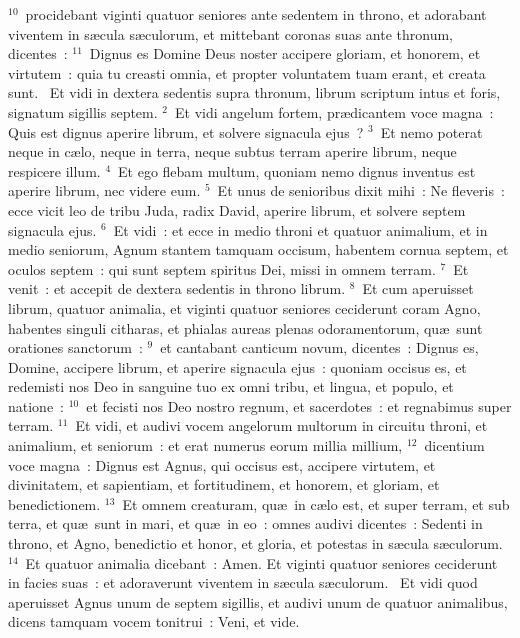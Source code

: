 ${}^{10}$~procidebant viginti quatuor seniores ante sedentem in throno, et adorabant viventem in s\ae cula s\ae culorum, et mittebant coronas suas ante thronum, dicentes~:
${}^{11}$~Dignus es Domine Deus noster accipere gloriam, et honorem, et virtutem~: quia tu creasti omnia, et propter voluntatem tuam erant, et creata sunt.
~\lettrine[lines=10,image=true,loversize=0.05,lraise=-0.03]{E}{}t vidi in dextera sedentis supra thronum, librum scriptum intus et foris, signatum sigillis septem.
${}^{2}$~Et vidi angelum fortem, pr\ae dicantem voce magna~: Quis est dignus aperire librum, et solvere signacula ejus~?
${}^{3}$~Et nemo poterat neque in c\ae lo, neque in terra, neque subtus terram aperire librum, neque respicere illum.
${}^{4}$~Et ego flebam multum, quoniam nemo dignus inventus est aperire librum, nec videre eum.
${}^{5}$~Et unus de senioribus dixit mihi~: Ne fleveris~: ecce vicit leo de tribu Juda, radix David, aperire librum, et solvere septem signacula ejus.
${}^{6}$~Et vidi~: et ecce in medio throni et quatuor animalium, et in medio seniorum, Agnum stantem tamquam occisum, habentem cornua septem, et oculos septem~: qui sunt septem spiritus Dei, missi in omnem terram.
${}^{7}$~Et venit~: et accepit de dextera sedentis in throno librum.
${}^{8}$~Et cum aperuisset librum, quatuor animalia, et viginti quatuor seniores ceciderunt coram Agno, habentes singuli citharas, et phialas aureas plenas odoramentorum, qu\ae\ sunt orationes sanctorum~:
${}^{9}$~et cantabant canticum novum, dicentes~: Dignus es, Domine, accipere librum, et aperire signacula ejus~: quoniam occisus es, et redemisti nos Deo in sanguine tuo ex omni tribu, et lingua, et populo, et natione~:
${}^{10}$~et fecisti nos Deo nostro regnum, et sacerdotes~: et regnabimus super terram.
${}^{11}$~Et vidi, et audivi vocem angelorum multorum in circuitu throni, et animalium, et seniorum~: et erat numerus eorum millia millium,
${}^{12}$~dicentium voce magna~: Dignus est Agnus, qui occisus est, accipere virtutem, et divinitatem, et sapientiam, et fortitudinem, et honorem, et gloriam, et benedictionem.
${}^{13}$~Et omnem creaturam, qu\ae\ in c\ae lo est, et super terram, et sub terra, et qu\ae\ sunt in mari, et qu\ae\ in eo~: omnes audivi dicentes~: Sedenti in throno, et Agno, benedictio et honor, et gloria, et potestas in s\ae cula s\ae culorum.
${}^{14}$~Et quatuor animalia dicebant~: Amen. Et viginti quatuor seniores ceciderunt in facies suas~: et adoraverunt viventem in s\ae cula s\ae culorum.
~\lettrine[lines=10,image=true,loversize=0.05,lraise=-0.03]{E}{}t vidi quod aperuisset Agnus unum de septem sigillis, et audivi unum de quatuor animalibus, dicens tamquam vocem tonitrui~: Veni, et vide.
